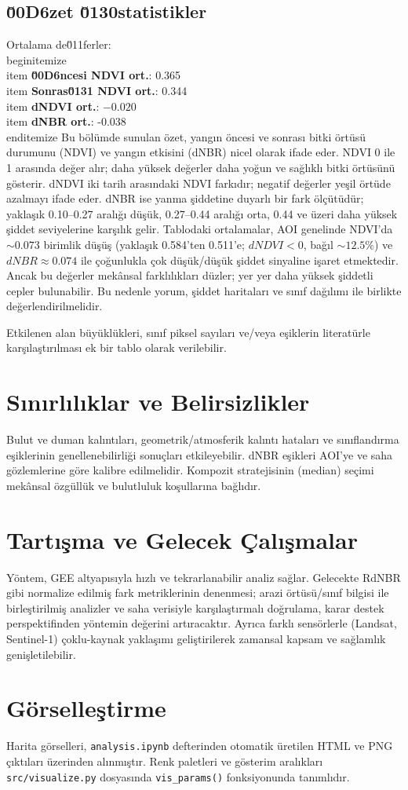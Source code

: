 \documentclass[11pt,a4paper]{article}
\begin{document}
\subsection{\u00D6zet \u0130statistikler}
\noindent Ortalama de\u011ferler:
\\begin{itemize}
  \\item \textbf{\u00D6ncesi NDVI ort.}: 0.365
  \\item \textbf{Sonras\u0131 NDVI ort.}: 0.344
  \\item \textbf{dNDVI ort.}: $-0.020$
  \\item \textbf{dNBR ort.}: -0.038
\\end{itemize}
Bu bölümde sunulan özet, yangın öncesi ve sonrası bitki örtüsü durumunu (NDVI) ve yangın etkisini (dNBR) nicel olarak ifade eder. NDVI 0 ile 1 arasında değer alır; daha yüksek değerler daha yoğun ve sağlıklı bitki örtüsünü gösterir. dNDVI iki tarih arasındaki NDVI farkıdır; negatif değerler yeşil örtüde azalmayı ifade eder. dNBR ise yanma şiddetine duyarlı bir fark ölçütüdür; yaklaşık 0.10--0.27 aralığı düşük, 0.27--0.44 aralığı orta, 0.44 ve üzeri daha yüksek şiddet seviyelerine karşılık gelir. Tablodaki ortalamalar, AOI genelinde NDVI’da \(\sim0.073\) birimlik düşüş (yaklaşık 0.584'ten 0.511'e; \(dNDVI<0\), bağıl \(\sim12.5\%\)) ve \(dNBR \approx 0.074\) ile çoğunlukla çok düşük/düşük şiddet sinyaline işaret etmektedir. Ancak bu değerler mekânsal farklılıkları düzler; yer yer daha yüksek şiddetli cepler bulunabilir. Bu nedenle yorum, şiddet haritaları ve sınıf dağılımı ile birlikte değerlendirilmelidir.

Etkilenen alan büyüklükleri, sınıf piksel sayıları ve/veya eşiklerin literatürle
karşılaştırılması ek bir tablo olarak verilebilir.

\section{Sınırlılıklar ve Belirsizlikler}
Bulut ve duman kalıntıları, geometrik/atmosferik kalıntı hataları ve sınıflandırma
eşiklerinin genellenebilirliği sonuçları etkileyebilir. dNBR eşikleri AOI'ye ve saha
gözlemlerine göre kalibre edilmelidir. Kompozit stratejisinin (median) seçimi mekânsal
özgüllük ve bulutluluk koşullarına bağlıdır.

\section{Tartışma ve Gelecek Çalışmalar}
Yöntem, GEE altyapısıyla hızlı ve tekrarlanabilir analiz sağlar. Gelecekte RdNBR gibi
normalize edilmiş fark metriklerinin denenmesi; arazi örtüsü/sınıf bilgisi ile
birleştirilmiş analizler ve saha verisiyle karşılaştırmalı doğrulama, karar destek
perspektifinden yöntemin değerini artıracaktır. Ayrıca farklı sensörlerle (Landsat,\,Sentinel-1)
çoklu-kaynak yaklaşımı geliştirilerek zamansal kapsam ve sağlamlık genişletilebilir.

\section{Görselleştirme}
Harita görselleri, \texttt{analysis.ipynb} defterinden otomatik üretilen HTML ve PNG
çıktıları üzerinden alınmıştır. Renk paletleri ve gösterim aralıkları \texttt{src/visualize.py}
dosyasında \texttt{vis\_params()} fonksiyonunda tanımlıdır.
\end{document}
